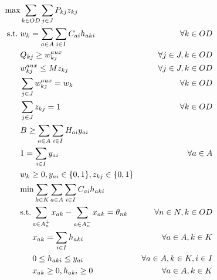 \documentclass{article}
\newcommand{\modelspace}{\hspace{1.5em}}
\begin{document}
  \begin{align}
    \text{max}    & \sum_{k \in OD} \sum_{j \in J} P_{kj} z_{kj}                                     & \label{eq:objective1lvlfinal} \\
    \text{s.t.}\; & w_k = \sum_{a \in A} \sum_{i \in I} C_{ai}h_{aki}                                & \forall k \in OD \label{eq:shortestpathfinal} \\
                  & Q_{kj} \geq w^{aux}_{kj}                                                         & \forall j \in J, k \in OD \label{eq:breakpoints} \\
                  & w^{aux}_{kj} \leq M z_{kj}                                                       & \forall j \in J, k \in OD \\
                  & \sum_{j \in J} w^{aux}_{kj} = w_k                                                & \forall k \in OD \\
                  & \sum_{j \in J} z_{kj} = 1                                                        & \forall k \in OD \label{eq:singularbreakpoint} \\
                  & B \geq \sum_{a \in A} \sum_{i \in I} H_{ai}y_{ai}                                & \label{eq:respectbudgetfinal} \\
                  & 1 = \sum_{i \in I} y_{ai}                                                        & \forall a \in A \label{eq:alwaysoneyfinal} \\
                  & w_k \geq 0, y_{ai} \in \{0,1\}, z_{kj} \in \{0,1\}                               & \nonumber \\
                  & \text{min} \sum_{k \in K} \sum_{a \in A} \sum_{i \in I} C_{ai} h_{aki}           & \label{eq:subproblemfinal} \\
                  & \text{s.t.} \sum_{a \in A_n^+} x_{ak} - \sum_{a \in A_n^-} x_{ak} = \theta_{nk}  & \forall n \in N, k \in OD \label{eq:flowbalancefinal} \\
                  & \modelspace x_{ak} = \sum_{i \in I} h_{aki}                                      & \forall a \in A, k \in K \label{eq:flowactivation} \\
                  & \modelspace 0 \leq h_{aki} \leq y_{ai}                                           & \forall a \in A, k \in K, i \in I \label{eq:respectinfra} \\
                  & \modelspace x_{ak} \geq 0, h_{aki} \geq 0                                        & \forall a \in A, k \in K \nonumber
  \end{align}
\end{document}

